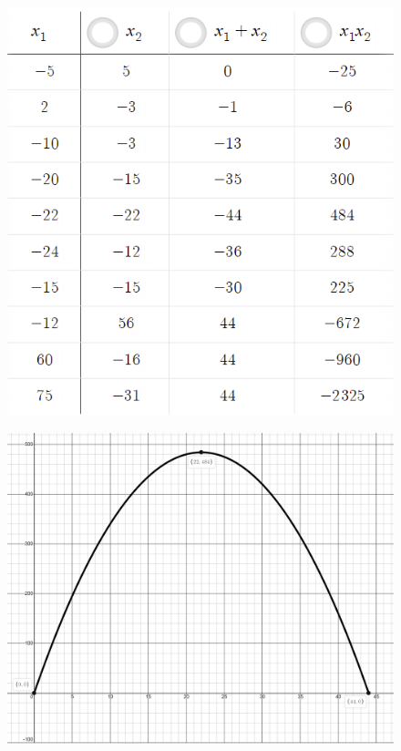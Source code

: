 \begin{example}
\begin{multicols}{2}
\begin{minipage}{0.4\textwidth}
\begin{figure}[H]
		\includegraphics[scale=0.65]{images/appliedOptimization/Optimization_maxProduct1.PNG}
		\end{figure}
    \end{minipage}
    \begin{minipage}{0.6\textwidth}
    \vfill
		\begin{figure}[H]
		\centering
		\includegraphics[scale=0.2]{images/appliedOptimization/Optimization_maxProduct3.PNG}
	    \end{figure}
    \end{minipage}
    

\end{multicols}
\end{example}
